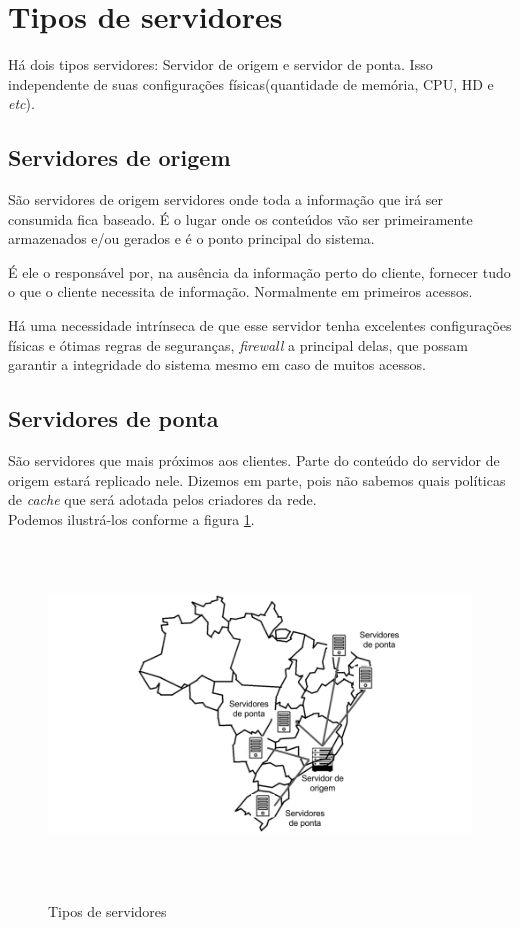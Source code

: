 \section{Tipos de servidores}
\label{section:tipos_de_servidores}
Há dois tipos servidores: Servidor de origem e servidor de ponta. Isso independente de suas configurações físicas(quantidade de memória, CPU, HD e \emph{etc}).

\subsection{Servidores de origem}

S\~ao servidores de origem servidores onde toda a informa\c{c}\~ao que irá ser consumida fica baseado. \'E o lugar onde os conte\'udos v\~ao ser primeiramente armazenados e/ou gerados e é o ponto principal do sistema.

\'E ele o respons\'avel por, na aus\^encia da informa\c{c}\~ao perto do cliente, fornecer tudo o que o cliente necessita de informa\c{c}\~ao. Normalmente em primeiros acessos.

H\'a uma necessidade intr\'inseca de que esse servidor tenha excelentes configura\c{c}\~oes f\'isicas e \'otimas regras de seguran\c{c}as, \textit{firewall} a principal delas, que possam garantir a integridade do sistema mesmo em caso de muitos acessos.

\subsection{Servidores de ponta}
S\~ao servidores que mais pr\'oximos aos clientes. Parte do conte\'udo do servidor de origem estar\'a replicado nele. Dizemos em parte, pois n\~ao sabemos quais pol\'iticas de \textit{cache} que ser\'a adotada pelos criadores da rede. 
\\
Podemos ilustr\'a-los conforme a figura \ref{figura:tipos_servidores}.
\begin{figure}[H]
\caption{Tipos de servidores}
\includegraphics[height=9cm]{Figuras/tipos_servidores.png} 
\label{figura:tipos_servidores} 
\end{figure}

